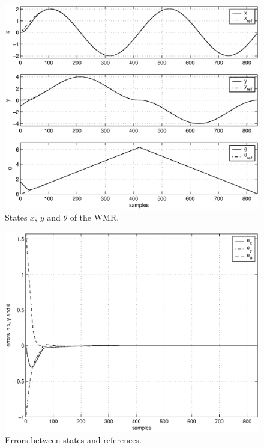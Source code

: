 \documentclass[conference]{IEEEtran} %
\begin{document}
\begin{figure}\begin{center}
    \includegraphics[width=.99\linewidth]{Figures/states.eps}
    \caption{States $x$, $y$ and $\theta$ of the WMR.}
    \label{fig:states}
\end{center}\end{figure}
\begin{figure}\begin{center}
    \includegraphics[width=.99\linewidth]{Figures/errors.eps}
    \caption{Errors between states and references.}
    \label{fig:errors}
\end{center}\end{figure}
\end{document}
